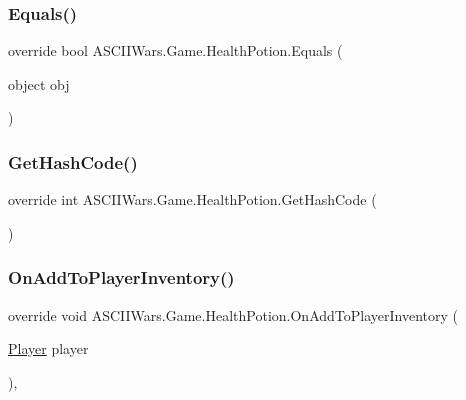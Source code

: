 \subsubsection{\texorpdfstring{Equals()}{Equals()}}
{\footnotesize\ttfamily override bool A\+S\+C\+I\+I\+Wars.\+Game.\+Health\+Potion.\+Equals (\begin{DoxyParamCaption}\item[{object}]{obj }\end{DoxyParamCaption})\hspace{0.3cm}{\ttfamily [inline]}}

\hypertarget{class_a_s_c_i_i_wars_1_1_game_1_1_health_potion_a825fcf689ad6dd4fcf48069980f8c176}{}\label{class_a_s_c_i_i_wars_1_1_game_1_1_health_potion_a825fcf689ad6dd4fcf48069980f8c176} 
\subsubsection{\texorpdfstring{Get\+Hash\+Code()}{GetHashCode()}}
{\footnotesize\ttfamily override int A\+S\+C\+I\+I\+Wars.\+Game.\+Health\+Potion.\+Get\+Hash\+Code (\begin{DoxyParamCaption}{ }\end{DoxyParamCaption})\hspace{0.3cm}{\ttfamily [inline]}}

\hypertarget{class_a_s_c_i_i_wars_1_1_game_1_1_health_potion_aecf685e26442760c13e59f294ce7a5e7}{}\label{class_a_s_c_i_i_wars_1_1_game_1_1_health_potion_aecf685e26442760c13e59f294ce7a5e7} 
\subsubsection{\texorpdfstring{On\+Add\+To\+Player\+Inventory()}{OnAddToPlayerInventory()}}
{\footnotesize\ttfamily override void A\+S\+C\+I\+I\+Wars.\+Game.\+Health\+Potion.\+On\+Add\+To\+Player\+Inventory (\begin{DoxyParamCaption}\item[{\hyperlink{class_a_s_c_i_i_wars_1_1_game_1_1_player}{Player}}]{player }\end{DoxyParamCaption})\hspace{0.3cm}{\ttfamily [inline]}, {\ttfamily [virtual]}}



